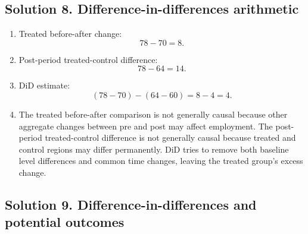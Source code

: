 \documentclass[11pt]{article}
\begin{document}
\subsection*{Solution 8. Difference-in-differences arithmetic}

\begin{solutionbox}
\begin{enumerate}[label=(\alph*)]
\item Treated before-after change:
\[
78-70=8.
\]

\item Post-period treated-control difference:
\[
78-64=14.
\]

\item DiD estimate:
\[
(78-70)-(64-60)=8-4=4.
\]

\item The treated before-after comparison is not generally causal because other aggregate changes between pre and post may affect employment. The post-period treated-control difference is not generally causal because treated and control regions may differ permanently. DiD tries to remove both baseline level differences and common time changes, leaving the treated group's excess change.
\end{enumerate}
\end{solutionbox}

\subsection*{Solution 9. Difference-in-differences and potential outcomes}
\end{document}
